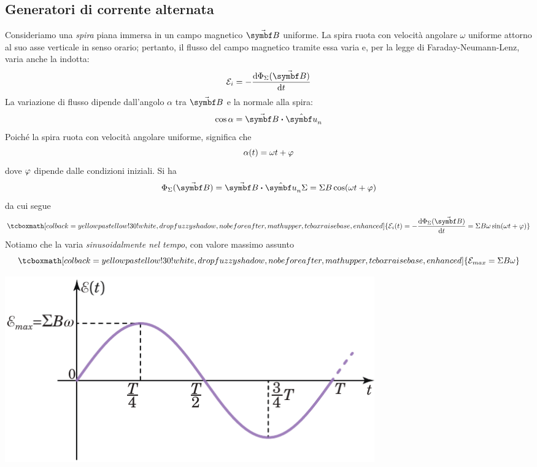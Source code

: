 \subsection{Generatori di corrente alternata}
Consideriamo una \textit{spira} piana immersa in un campo magnetico $\vba{B}$ uniforme. La spira ruota con velocità angolare $\omega$ uniforme attorno al suo asse verticale in senso orario; pertanto, il flusso del campo magnetico tramite essa varia e, per la legge di Faraday-Neumann-Lenz, varia anche la \fem indotta:
\begin{equation*}
	\mathcal{E}_i=-\dv{\Phi_{\Sigma}(\vba{B})}{t}
\end{equation*}
La variazione di flusso dipende dall'angolo $\alpha$ tra $\vba{B}$ e la normale alla spira:
\begin{equation*}
	\cos\alpha=\vba{B}\vdot\vbh{u}_n
\end{equation*}
Poiché la spira ruota con velocità angolare uniforme, significa che
\begin{equation*}
	\alpha(t)=\omega t+\oldphi
\end{equation*}
dove $\oldphi$ dipende dalle condizioni iniziali. Si ha
\begin{equation*}
	\Phi_{\Sigma}(\vba{B})=\vba{B}\vdot\vbh{u}_n\Sigma=\Sigma B\cos(\omega t+\oldphi)
\end{equation*}
da cui segue
\begin{equation}
	\tcboxmath[colback=yellowpastellow!30!white,drop fuzzy shadow, nobeforeafter, math upper, tcbox raise base, enhanced]{\mathcal{E}_i(t)=-\dv{\Phi_{\Sigma}(\vba{B})}{t}=\Sigma B\omega\sin(\omega t+\oldphi)}
\end{equation}
Notiamo che la \fem varia \textit{sinusoidalmente nel tempo}, con valore massimo assunto 
\begin{equation}
	\tcboxmath[colback=yellowpastellow!30!white,drop fuzzy shadow, nobeforeafter, math upper, tcbox raise base, enhanced]{\mathcal{E}_{max}=\Sigma B\omega}
\end{equation}
\begin{center}
	\includegraphics[width=0.7\textwidth]{images/chp11/chp11ddpgeneratoriACgraf.pdf}
\end{center}
